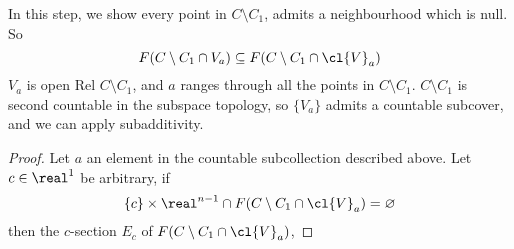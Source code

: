 \documentclass[../main-v2-manifolds.tex]{subfiles}
\begin{document}
\begin{step}\label{lee-sards-case1-neighbourhoods}
    In this step, we show every point in $C\setminus C_1$, admits a neighbourhood which is null. So
    \[
        F(C\setminus C_1 \cap V_a)\subseteq F(C\setminus C_1\cap \cl{V}_a)
    \]
    $V_a$ is open Rel $C\setminus C_1$, and $a$ ranges through all the points in $C\setminus C_1$. $C\setminus C_1$ is second countable in the subspace topology, so $\{V_a\}$ admits a countable subcover, and we can apply subadditivity.
\end{step}
\begin{proof}
    Let $a$ an element in the countable subcollection described above. Let $c\in\real^{1}$ be arbitrary, if
    \[
        \{c\}\times\real^{n-1}\cap F(C\setminus C_1\cap \cl{V}_a)=\varnothing
    \]
    then the $c$-section $E_c$ of $F(C\setminus C_1\cap \cl{V}_a)$, 
    

\end{proof}
\end{document}
